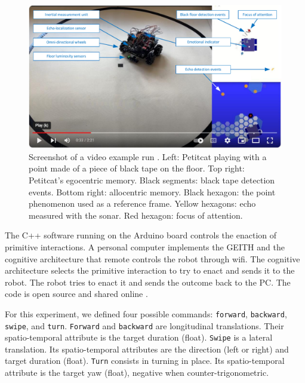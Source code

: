 \documentclass[runningheads]{llncs}
\begin{document}
\begin{figure}
	\includegraphics[width=\textwidth]{Figure_video.pdf}
	\caption{Screenshot of a video example run \cite{georgeon_petitcat_2024}.
		Left: Petitcat playing with a point made of a piece of black tape on the floor.
		Top right: Petitcat's egocentric memory. Black segments: black tape detection events. 
		Bottom right: allocentric memory. Black hexagon: the point phenomenon used as a reference frame. Yellow hexagons: echo measured with the sonar. Red hexagon: focus of attention.} \label{fig:video}
\end{figure}

The C++ software running on the Arduino board controls the enaction of primitive interactions. 
A personal computer implements the GEITH and the cognitive architecture that remote controls the robot through wifi.
The cognitive architecture selects the primitive interaction to try to enact and sends it to the robot. 
The robot tries to enact it and sends the outcome back to the PC.  
The code is open source and shared online \cite{petitcat_github}.

For this experiment, we defined four possible commands: \texttt{forward}, \texttt{backward}, \texttt{swipe}, and \texttt{turn}. 
\texttt{Forward} and \texttt{backward} are longitudinal translations. Their spatio-temporal attribute is the target duration (float).   
\texttt{Swipe} is a lateral translation. Its spatio-temporal attributes are the direction (left or right) and target duration (float). 
\texttt{Turn} consists in turning in place. Its spatio-temporal attribute is the target yaw (float), negative when counter-trigonometric. 
\end{document}
